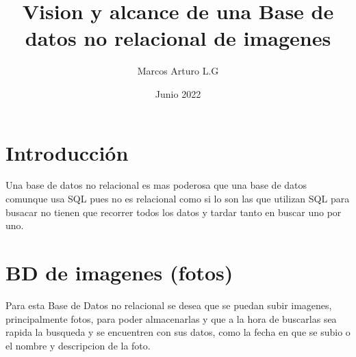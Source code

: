\documentclass{article}
\title{Vision y alcance de una Base de datos no relacional de imagenes}
\author{Marcos Arturo L.G}
\date{Junio 2022}
\begin{document}
\maketitle

\section{Introducción}
Una base de datos no relacional es mas poderosa que una base de datos comunque usa SQL pues no es relacional como si lo son las que utilizan SQL para busacar no tienen que recorrer todos los datos y tardar tanto en buscar uno por uno.

\section{BD de imagenes (fotos)}
Para esta Base de Datos no relacional se desea que se puedan subir imagenes, principalmente fotos, para poder almacenarlas y que a la hora de buscarlas sea rapida la busqueda y se encuentren con sus datos, como la fecha en que se subio o el nombre y descripcion de la foto.
\end{document}
